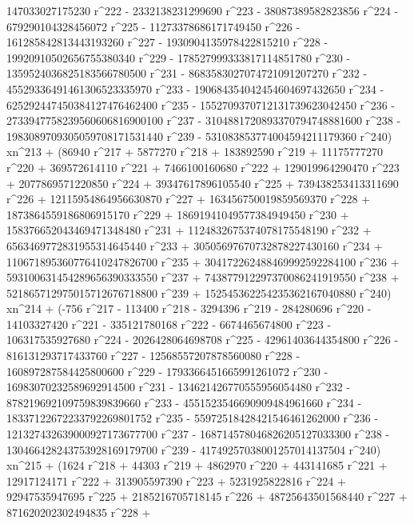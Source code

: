        147033027175230 r^222 - 2332138231299690 r^223 - 
       38087389582823856 r^224 - 679290104328456072 r^225 - 
       11273378686171749450 r^226 - 161285842813443193260 r^227 - 
       1930904135978422815210 r^228 - 19920910502656755380340 r^229 - 
       178527999333817114851780 r^230 - 
       1359524036825183566780500 r^231 - 
       8683583027074721091207270 r^232 - 
       45529336491461306523335970 r^233 - 
       190684354042454604697432650 r^234 - 
       625292447450384127476462400 r^235 - 
       1552709370712131739623042450 r^236 - 
       2733947758239560606816900100 r^237 - 
       3104881720893370794748881600 r^238 - 
       1983089709305059708171531440 r^239 - 
       531083853774004594211179360 r^240) xn^213 + (86940 r^217 + 
       5877270 r^218 + 183892590 r^219 + 11175777270 r^220 + 
       369572614110 r^221 + 7466100160680 r^222 + 
       129019964290470 r^223 + 2077869571220850 r^224 + 
       39347617896105540 r^225 + 739438253413311690 r^226 + 
       12115954864956630870 r^227 + 163456750019859569370 r^228 + 
       1873864559186806915170 r^229 + 18691941049577384949450 r^230 + 
       158376652043469471348480 r^231 + 
       1124832675374078175548190 r^232 + 
       6563469772831955314645440 r^233 + 
       30505697670732878227430160 r^234 + 
       110671895360776410247826700 r^235 + 
       304172262488469992592284100 r^236 + 
       593100631454289656390333550 r^237 + 
       743877912297370086241919550 r^238 + 
       521865712975015712676718800 r^239 + 
       152545362254235362167040880 r^240) xn^214 + (-756 r^217 - 
       113400 r^218 - 3294396 r^219 - 284280696 r^220 - 
       14103327420 r^221 - 335121780168 r^222 - 6674465674800 r^223 - 
       106317535927680 r^224 - 2026428064698708 r^225 - 
       42961403644354800 r^226 - 816131293717433760 r^227 - 
       12568557207878560080 r^228 - 160897287584425800600 r^229 - 
       1793366451665991261072 r^230 - 16983070232589692914500 r^231 - 
       134621426770555956054480 r^232 - 
       878219692109759839839660 r^233 - 
       4551523546690909484961660 r^234 - 
       18337122672233792269801752 r^235 - 
       55972518428421546461262000 r^236 - 
       121327432639000927173677700 r^237 - 
       168714578046826205127033300 r^238 - 
       130466428243753928169179700 r^239 - 
       41749257038001257014137504 r^240) xn^215 + (1624 r^218 + 
       44303 r^219 + 4862970 r^220 + 443141685 r^221 + 
       12917124171 r^222 + 313905597390 r^223 + 5231925822816 r^224 + 
       92947535947695 r^225 + 2185216705718145 r^226 + 
       48725643501568440 r^227 + 871620202302494835 r^228 + 
